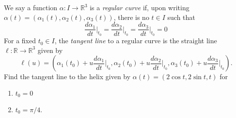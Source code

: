 \documentclass[12 pt, letterpaper]{hmcpset}
\begin{document}
\begin{problem}[Problem 1.]
	We say a function $\alpha : I \to \mathbb R^3$ is a \textit{regular curve} if, upon writing $\alpha(t) = (\alpha_1(t), \alpha_2(t), \alpha_3(t))$, there is no $t \in I$ such that
	\[
		\frac{d \alpha_1}{dt} \Big |_{t_0} = \frac{d \alpha_2}{dt} \Big |_{t_0} = \frac{d \alpha_3}{dt} \Big |_{t_0} = 0
	\]
	For a fixed $t_0 \in I$, the \textit{tangent line} to a regular curve is the straight line $\ell : \mathbb R \to \mathbb R^3$ given by
	\[
		\ell(u) = \left ( \alpha_1(t_0) + u \frac{d \alpha_1}{dt} \Big |_{t_0}, \alpha_2(t_0) + u \frac{d \alpha_2}{dt} \Big |_{t_0}, \alpha_3(t_0) + u \frac{d \alpha_3}{dt} \Big |_{t_0} \right ).
	\]
	Find the tangent line to the helix given by $\alpha(t) = (2 \cos t, 2 \sin t, t)$ for
	\begin{enumerate}
		\item $t_0 = 0$
		\item $t_0 = \pi/4$.
	\end{enumerate}
\end{problem}
\end{document}
